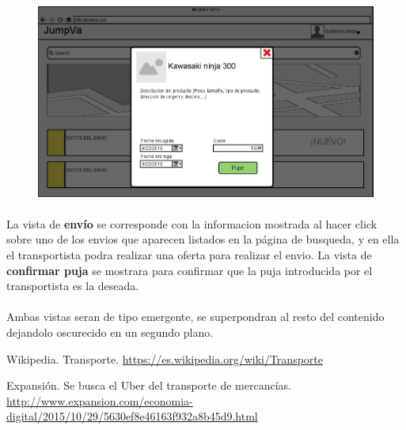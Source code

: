 \documentclass[10pt, a4paper,spanish]{article}
\begin{document}
			\begin{figure}[H]
				\centering
				\begin{minipage}[b]{0.7\textwidth}
					\includegraphics[width=\textwidth]{res/DetallesDeEnvio.png}

				\end{minipage}
			\end{figure}

			\paragraph{}
			La vista de \textbf{envío} se corresponde con la informacion mostrada al hacer click sobre uno de los envios que aparecen listados en la página de busqueda, y en ella el transportista podra realizar una oferta para realizar el envio. La vista de \textbf{confirmar puja} se mostrara para confirmar que la puja introducida por el transportista es la deseada.

			\paragraph{}
			Ambas vistas seran de tipo emergente, se superpondran al resto del contenido dejandolo oscurecido en un segundo plano.
	\begin{thebibliography}{9}

		Wikipedia. Transporte. \url{https://es.wikipedia.org/wiki/Transporte}

		Expansión. Se busca el Uber del transporte de mercancías. \url{http://www.expansion.com/economia-digital/2015/10/29/5630ef8e46163f932a8b45d9.html}

	\end{thebibliography}
\end{document}
